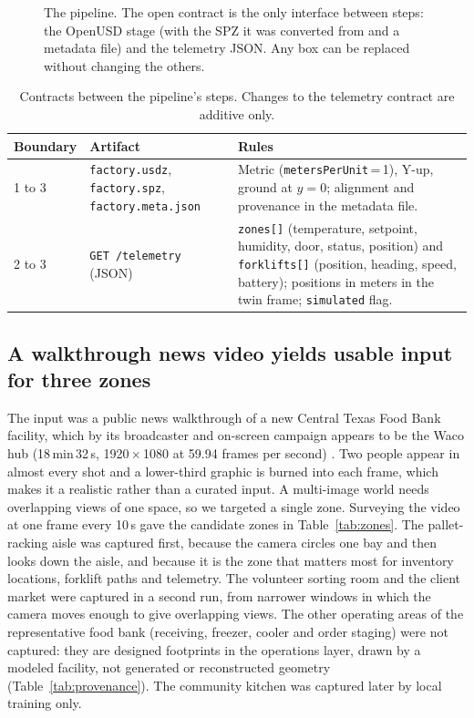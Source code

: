 \documentclass{article}
\newcommand{\code}[1]{\texttt{\small #1}}
\begin{document}
\begin{figure}[t]
\centering

\caption{The pipeline. The open contract is the only
interface between steps: the OpenUSD stage (with the SPZ it was converted from
and a metadata file) and the telemetry JSON. Any box can be replaced without
changing the others.}
\label{fig:overview}
\end{figure}

\begin{table}[t]
\caption{Contracts between the pipeline's steps. Changes to the telemetry contract are additive only.}
\centering\small
\begin{tabularx}{\linewidth}{@{}l>{\raggedright\arraybackslash}p{3.6cm}>{\raggedright\arraybackslash}X@{}}
\toprule
Boundary & Artifact & Rules \\
\midrule
1 to 3 & \code{factory.usdz}, \code{factory.spz}, \code{factory.meta.json} &
  Metric (\code{metersPerUnit}\,=\,1), Y-up, ground at $y=0$; alignment and provenance in the metadata file. \\
2 to 3 & \code{GET /telemetry} (JSON) &
  \code{zones[]} (temperature, setpoint, humidity, door, status, position) and
  \code{forklifts[]} (position, heading, speed, battery); positions in meters in the twin frame; \code{simulated} flag. \\
\bottomrule
\end{tabularx}
\label{tab:contracts}
\end{table}

\subsection{A walkthrough news video yields usable input for three zones}
The input was a public news walkthrough of a new Central Texas Food Bank
facility, which by its broadcaster and on-screen campaign appears to be the
Waco hub \cite{kxxv2026waco} (18\,min\,32\,s, 1920\,$\times$\,1080 at 59.94 frames per second)
\cite{kxxv2026ctfb}. Two people appear in almost every shot and a lower-third
graphic is burned into each frame, which makes it a realistic rather than a
curated input. A multi-image world needs overlapping views of one space, so we
targeted a single zone. Surveying the video at one frame every 10\,s gave the
candidate zones in Table~\ref{tab:zones}. The pallet-racking aisle was
captured first, because the camera circles one bay and then looks down the
aisle, and because it is the zone that matters most for inventory locations,
forklift paths and telemetry. The volunteer sorting room and the client market
were captured in a second run, from narrower windows in which the camera moves
enough to give overlapping views. The other operating areas of the
representative food bank (receiving, freezer, cooler and order staging) were
not captured: they are designed footprints in the operations layer, drawn by
a modeled facility, not generated or reconstructed geometry
(Table~\ref{tab:provenance}). The community kitchen was captured later by
local training only.
\end{document}
